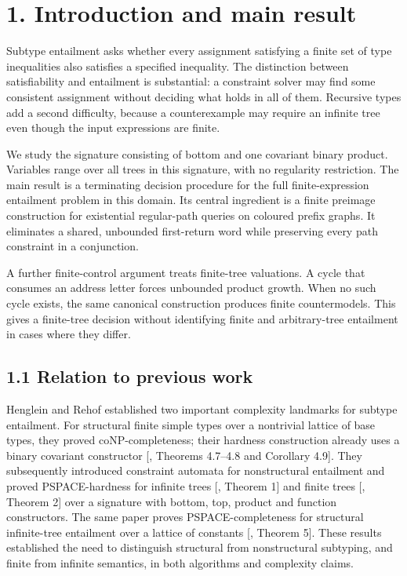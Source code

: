 \documentclass[
  11pt,
  a4paper,
]{article}
\begin{document}

\newpage
\begingroup\fontsize{9}{10}\selectfont
\tableofcontents
\endgroup
\newpage

\section{1. Introduction and main
result}\label{introduction-and-main-result}

Subtype entailment asks whether every assignment satisfying a finite set
of type inequalities also satisfies a specified inequality. The
distinction between satisfiability and entailment is substantial: a
constraint solver may find some consistent assignment without deciding
what holds in all of them. Recursive types add a second difficulty,
because a counterexample may require an infinite tree even though the
input expressions are finite.

We study the signature consisting of bottom and one covariant binary
product. Variables range over all trees in this signature, with no
regularity restriction. The main result is a terminating decision
procedure for the full finite-expression entailment problem in this
domain. Its central ingredient is a finite preimage construction for
existential regular-path queries on coloured prefix graphs. It
eliminates a shared, unbounded first-return word while preserving every
path constraint in a conjunction.

A further finite-control argument treats finite-tree valuations. A cycle
that consumes an address letter forces unbounded product growth. When no
such cycle exists, the same canonical construction produces finite
countermodels. This gives a finite-tree decision without identifying
finite and arbitrary-tree entailment in cases where they differ.

\subsection{1.1 Relation to previous
work}\label{relation-to-previous-work}

Henglein and Rehof established two important complexity landmarks for
subtype entailment. For structural finite simple types over a nontrivial
lattice of base types, they proved coNP-completeness; their hardness
construction already uses a binary covariant constructor
{[}, Theorems 4.7--4.8 and Corollary 4.9{]}. They
subsequently introduced constraint automata for nonstructural entailment
and proved PSPACE-hardness for infinite trees {[},
Theorem 1{]} and finite trees {[}, Theorem 2{]}
over a signature with bottom, top, product and function constructors.
The same paper proves PSPACE-completeness for structural infinite-tree
entailment over a lattice of constants {[},
Theorem 5{]}. These results established the need to distinguish
structural from nonstructural subtyping, and finite from infinite
semantics, in both algorithms and complexity claims.
\end{document}
